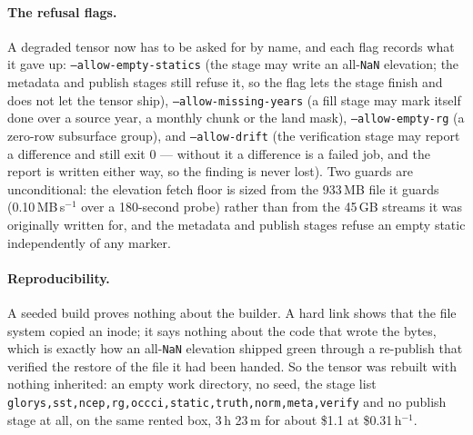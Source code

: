\documentclass[10pt]{article}
\newcommand{\code}[1]{\texttt{#1}}
\begin{document}
\paragraph{The refusal flags.} A degraded tensor now has to be asked for by
name, and each flag records what it gave up: \code{--allow-empty-statics} (the
stage may write an all-\code{NaN} elevation; the metadata and publish stages
still refuse it, so the flag lets the stage finish and does not let the tensor
ship), \code{--allow-missing-years} (a fill stage may mark itself done over a
source year, a monthly chunk or the land mask), \code{--allow-empty-rg} (a
zero-row subsurface group), and \code{--allow-drift} (the verification stage
may report a difference and still exit 0 --- without it a difference is a
failed job, and the report is written either way, so the finding is never
lost). Two guards are unconditional: the elevation fetch floor is sized from
the 933\,MB file it guards (0.10\,MB\,s$^{-1}$ over a 180-second probe) rather
than from the 45\,GB streams it was originally written for, and the metadata
and publish stages refuse an empty static independently of any marker.

\paragraph{Reproducibility.} A seeded build proves nothing about the builder.
A hard link shows that the file system copied an inode; it says nothing about
the code that wrote the bytes, which is exactly how an all-\code{NaN}
elevation shipped green through a re-publish that verified the restore of the
file it had been handed. So the tensor was rebuilt with nothing inherited: an
empty work directory, no seed, the stage list
\code{glorys,sst,ncep,rg,occci,static,truth,norm,meta,verify} and no publish
stage at all, on the same rented box, 3\,h 23\,m for about \$1.1 at
\$0.31\,h$^{-1}$.
\end{document}
